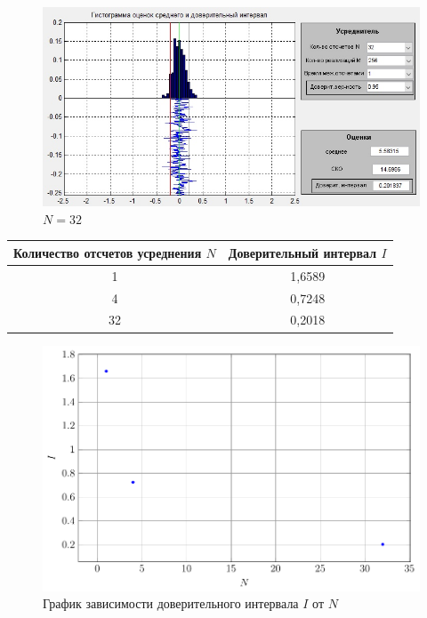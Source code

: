 \begin{figure}[H]
		\centering
		\includegraphics[width=0.8\linewidth]{tasks/task6/realize_N=32}
		\caption*{$N=32$}
\end{figure}
\begin{table}[htbp]
	\centering
	\begin{tabular}{|c|c|}
		\toprule
		\multicolumn{1}{|c|}{\textbf{Количество отсчетов усреднения $N$}} & \textbf{Доверительный интервал $I$} \\
		\midrule
		1     & 1,6589 \\
		\midrule
		4     & 0,7248 \\
		\midrule
		32    & 0,2018 \\
		\bottomrule
	\end{tabular}%
	\label{tab:addlabel}%
\end{table}%
 \begin{figure}[H]
	\centering
	\includegraphics[width=0.8\linewidth]{tasks//plot6}
	\caption*{График зависимости доверительного интервала $I$ от $N$}
	\end{figure}

